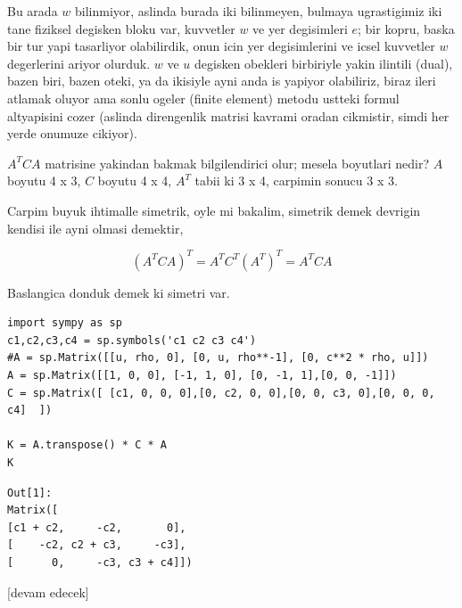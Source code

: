 \documentclass[12pt,fleqn]{article}\usepackage{../../common}
\begin{document}
Bu arada $w$ bilinmiyor, aslinda burada iki bilinmeyen, bulmaya ugrastigimiz iki
tane fiziksel degisken bloku var, kuvvetler $w$ ve yer degisimleri $e$; bir
kopru, baska bir tur yapi tasarliyor olabilirdik, onun icin yer degisimlerini ve
icsel kuvvetler $w$ degerlerini ariyor olurduk. $w$ ve $u$ degisken obekleri
birbiriyle yakin ilintili (dual), bazen biri, bazen oteki, ya da ikisiyle ayni
anda is yapiyor olabiliriz, biraz ileri atlamak oluyor ama sonlu ogeler (finite
element) metodu ustteki formul altyapisini cozer (aslinda direngenlik matrisi
kavrami oradan cikmistir, simdi her yerde onumuze cikiyor).

$A^T C A$ matrisine yakindan bakmak bilgilendirici olur; mesela boyutlari nedir?
$A$ boyutu 4 x 3, $C$ boyutu 4 x 4, $A^T$ tabii ki 3 x 4, carpimin sonucu 3 x 3.

Carpim buyuk ihtimalle simetrik, oyle mi bakalim, simetrik demek devrigin
kendisi ile ayni olmasi demektir, 

$$
(A^T C A)^T = A^T C^T (A^T)^T = A^T C A 
$$

Baslangica donduk demek ki simetri var.

\begin{verbatim}
import sympy as sp
c1,c2,c3,c4 = sp.symbols('c1 c2 c3 c4')
#A = sp.Matrix([[u, rho, 0], [0, u, rho**-1], [0, c**2 * rho, u]])
A = sp.Matrix([[1, 0, 0], [-1, 1, 0], [0, -1, 1],[0, 0, -1]])
C = sp.Matrix([ [c1, 0, 0, 0],[0, c2, 0, 0],[0, 0, c3, 0],[0, 0, 0, c4]  ])

K = A.transpose() * C * A
K
\end{verbatim}

\begin{verbatim}
Out[1]: 
Matrix([
[c1 + c2,     -c2,       0],
[    -c2, c2 + c3,     -c3],
[      0,     -c3, c3 + c4]])
\end{verbatim}





















[devam edecek]
\end{document}
